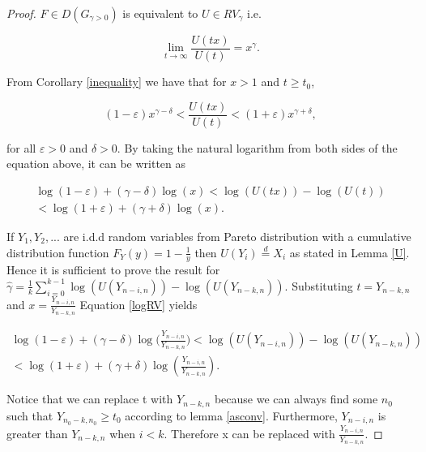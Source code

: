 \documentclass[english,12pt,a4paper,pdftex,sci,utf8]{aaltothesis} %
\begin{document}
\begin{proof}

$F \in D(G_{\gamma>0})$ is equivalent to $U \in RV_{\gamma}$ i.e.

\begin{equation*}
\lim_{t\to\infty} \frac{U(tx)}{U(t)} = x^{\gamma}.
\end{equation*}

From Corollary \ref{inequality} we have that for $x>1$ and $t \geq t_0$,

\begin{equation*}
(1-\varepsilon) x^{\gamma - \delta} < \frac{U(tx)}{U(t)} < (1+\varepsilon) x^{\gamma + \delta},
\end{equation*}

for all $\varepsilon>0$ and $\delta>0$. By taking the natural logarithm from both sides of the equation above, it can be written as

\begin{equation}
\begin{split}
\log(1 - \varepsilon) + (\gamma - \delta) \log(x) < \log(U(tx)) - \log(U(t)) \\
< \log(1 + \varepsilon) + (\gamma + \delta) \log(x).
\end{split}
\label{logRV}
\end{equation}

If $Y_1, Y_2,...$ are i.d.d random variables from Pareto distribution with a cumulative distribution function $F_Y(y) = 1 - \frac{1}{y}$ then $U(Y_i)  \overset{d}{=} X_i$  as stated in Lemma \ref{U}. Hence it is sufficient to prove the result for $ \hat{\gamma} =  \frac{1}{k} \sum_{i=0}^{k-1} \log(U(Y_{n-i,n})) - \log(U(Y_{n-k,n})) $. Substituting $t = Y_{n-k,n}$ and $x =\frac{Y_{n-i,n}}{Y_{n-k,n}}$ Equation \eqref{logRV} yields


\begin{equation}
\begin{split}
\log(1 - \varepsilon) + (\gamma - \delta) \log\Big(\frac{Y_{n-i,n}}{Y_{n-k,n}}\Big) < \log(U(Y_{n-i,n})) - \log(U(Y_{n-k,n})) \\
< \log(1 + \varepsilon) + (\gamma + \delta) \log(\frac{Y_{n-i,n}}{Y_{n-k,n}}).
\end{split}
\label{log}
\end{equation}

Notice that we can replace t with $Y_{n-k,n}$ because we can always find some $n_0$ such that $Y_{n_0-k,n_0} \geq t_0$ according to lemma \ref{asconv}. Furthermore, $Y_{n-i,n}$ is greater than $Y_{n-k,n}$ when $i<k$. Therefore x can be replaced with $\frac{Y_{n-i,n}}{Y_{n-k,n}}$.


\end{proof}
\end{document}
